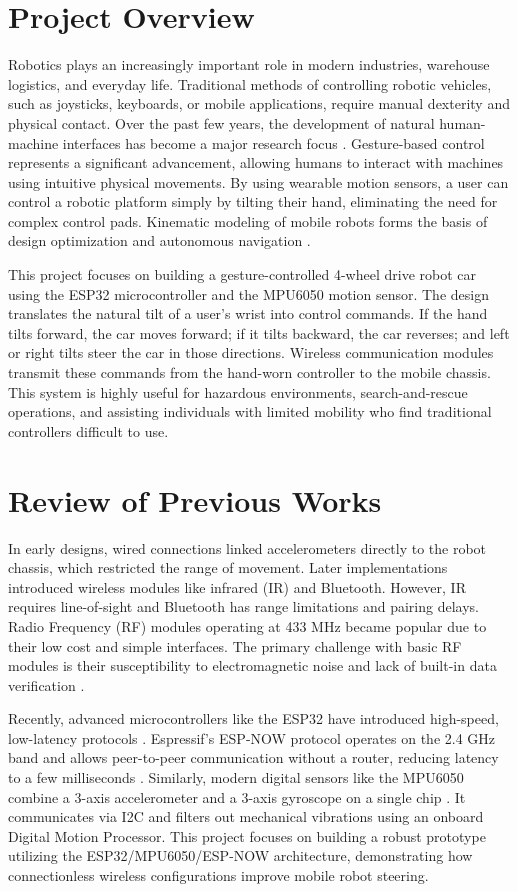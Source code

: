 \documentclass[12pt,a4paper,oneside]{report}
\begin{document}
\section{Project Overview}
Robotics plays an increasingly important role in modern industries, warehouse logistics, and everyday life. Traditional methods of controlling robotic vehicles, such as joysticks, keyboards, or mobile applications, require manual dexterity and physical contact. Over the past few years, the development of natural human-machine interfaces has become a major research focus \cite{hmi_ref}. Gesture-based control represents a significant advancement, allowing humans to interact with machines using intuitive physical movements. By using wearable motion sensors, a user can control a robotic platform simply by tilting their hand, eliminating the need for complex control pads. Kinematic modeling of mobile robots forms the basis of design optimization and autonomous navigation \cite{robotics_ref}.\par
\medskip
This project focuses on building a gesture-controlled 4-wheel drive robot car using the ESP32 microcontroller and the MPU6050 motion sensor. The design translates the natural tilt of a user's wrist into control commands. If the hand tilts forward, the car moves forward; if it tilts backward, the car reverses; and left or right tilts steer the car in those directions. Wireless communication modules transmit these commands from the hand-worn controller to the mobile chassis. This system is highly useful for hazardous environments, search-and-rescue operations, and assisting individuals with limited mobility who find traditional controllers difficult to use.

\section{Review of Previous Works}
In early designs, wired connections linked accelerometers directly to the robot chassis, which restricted the range of movement. Later implementations introduced wireless modules like infrared (IR) and Bluetooth. However, IR requires line-of-sight and Bluetooth has range limitations and pairing delays. Radio Frequency (RF) modules operating at 433 MHz became popular due to their low cost and simple interfaces. The primary challenge with basic RF modules is their susceptibility to electromagnetic noise and lack of built-in data verification \cite{motor_ref}.\par
\medskip
Recently, advanced microcontrollers like the ESP32 have introduced high-speed, low-latency protocols \cite{sensor1}. Espressif's ESP-NOW protocol operates on the 2.4 GHz band and allows peer-to-peer communication without a router, reducing latency to a few milliseconds \cite{espnow_ref}. Similarly, modern digital sensors like the MPU6050 combine a 3-axis accelerometer and a 3-axis gyroscope on a single chip \cite{imu_main}. It communicates via I2C and filters out mechanical vibrations using an onboard Digital Motion Processor. This project focuses on building a robust prototype utilizing the ESP32/MPU6050/ESP-NOW architecture, demonstrating how connectionless wireless configurations improve mobile robot steering.
\end{document}
